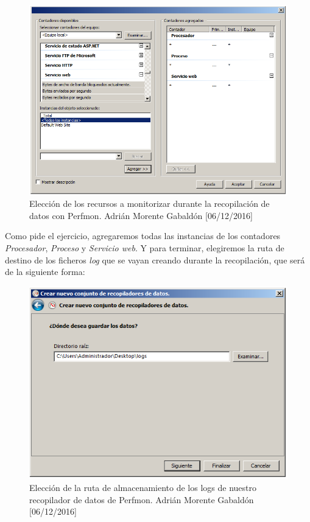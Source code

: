 \begin{figure}[H]
	\centering
	\includegraphics[scale=0.6]{recop2}
	\caption{Elección de los recursos a monitorizar durante la recopilación de datos con Perfmon. Adrián Morente Gabaldón [06/12/2016]}
	\label{figura13}
\end{figure}
Como pide el ejercicio, agregaremos todas las instancias de los contadores \emph{Procesador}, \emph{Proceso} y \emph{Servicio web}. Y para terminar, elegiremos la ruta de destino de los ficheros \emph{log} que se vayan creando durante la recopilación, que será de la siguiente forma:
\begin{figure}[H]
	\centering
	\includegraphics[scale=0.6]{recop3}
	\caption{Elección de la ruta de almacenamiento de los logs de nuestro recopilador de datos de Perfmon. Adrián Morente Gabaldón [06/12/2016]}
	\label{figura14}
\end{figure}
